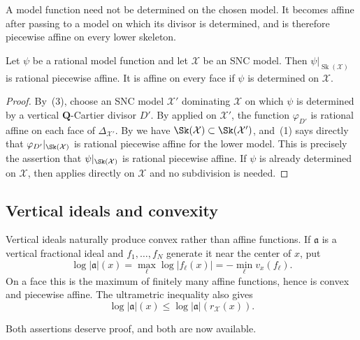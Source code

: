 A model function need not be determined on the chosen model. It becomes
affine after passing to a model on which its divisor is determined, and is
therefore piecewise affine on every lower skeleton.

\begin{proposition}
\label{prop:skeleton-model-pa}
Let $\psi$ be a rational model function and let $\mathcal X$ be an SNC
model. Then $\psi|_{\operatorname{Sk}(\mathcal X)}$ is rational piecewise
affine. It is affine on every face if $\psi$ is determined on
$\mathcal X$.
\end{proposition}

\begin{proof}
By \,(3), choose an SNC model $\mathcal X'$
dominating $\mathcal X$ on which
$\psi$ is determined by a vertical $\mathbf Q$-Cartier divisor $D'$.
By  applied on $\mathcal X'$, the function
$\varphi_{D'}$ is rational affine on each face of
$\Delta_{\mathcal X'}$. By  we have
$\Sk(\mathcal X)\subset\Sk(\mathcal X')$, and
\,(1) says directly that
$\varphi_{D'}|_{\Sk(\mathcal X)}$ is rational piecewise affine for the
lower model. This is precisely the assertion that
$\psi|_{\Sk(\mathcal X)}$ is rational piecewise affine. If $\psi$ is
already determined on $\mathcal X$, then
 applies directly on $\mathcal X$ and no
subdivision is needed.
\end{proof}

\subsection{Vertical ideals and convexity}

Vertical ideals naturally produce convex rather than affine functions. If
$\mathfrak a$ is a vertical fractional ideal and $f_1,\ldots,f_N$
generate it near the center of $x$, put
\[
 \log|\mathfrak a|(x)
   =\max_\ell\log|f_\ell(x)|
   =-\min_\ell v_x(f_\ell).
\]
On a face this is the maximum of finitely many affine functions, hence is
convex and piecewise affine. The ultrametric inequality also gives
\[
               \log|\mathfrak a|(x)
        \leq \log|\mathfrak a|(r_{\mathcal X}(x)).
\]

Both assertions deserve proof, and both are now available.

